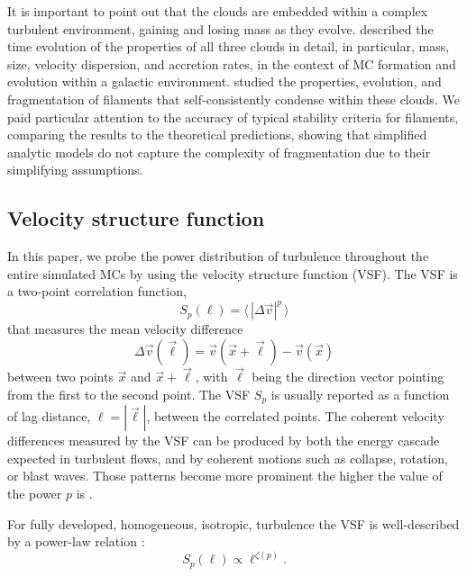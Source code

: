 \documentclass{aa}		%
\begin{document}
It is important to point out that the clouds are embedded within a complex turbulent environment, gaining and losing mass as they evolve.
 described the time evolution of the properties of all three clouds in detail, in particular, mass, size, velocity dispersion, and accretion rates, in the context of MC formation and evolution within a galactic environment.
 studied the properties, evolution, and fragmentation of filaments that self-consistently condense within these clouds. 
We paid particular attention to the accuracy of typical stability criteria for filaments, comparing the results to the theoretical predictions, showing that simplified analytic models do not capture the complexity of fragmentation due to their simplifying assumptions.


\subsection{Velocity structure function}\label{methods:vsf}

In this paper, we probe the power distribution of turbulence throughout the entire simulated MCs by using the velocity structure function (VSF).
The VSF is a two-point correlation function,
\begin{equation}
	{S}_p (\ell) = \langle \, |\Delta \vec{v}|^p  \, \rangle
	\label{equ:method:def_vsf}
\end{equation}
that measures the mean velocity difference 
\begin{equation}
    \Delta \vec{v} (\vec{\ell}) = \vec{v}(\vec{x}+\vec{\ell}) - \vec{v}(\vec{x})
\end{equation} 
between two points $\vec{x}$ and $\vec{x}+\vec{\ell}$, with $\vec{\ell}$ being the direction vector pointing from the first to the second point.
The VSF $S_p$ is usually reported as a function of lag distance, $\ell = |\vec{\ell}|$, between the correlated points.
The coherent velocity differences measured by the VSF can be produced by both the energy cascade expected in turbulent flows, and by coherent motions such as collapse, rotation, or blast waves.
Those patterns become more prominent the higher the value of the power $p$ is \citep{Heyer2004}.

For fully developed, homogeneous, isotropic, turbulence the VSF is well-described by a power-law relation \citep{Kolmogorov1941,She1994,Boldyrev2002}:
\begin{equation}
	\mathit{S}_p (\ell) \propto \ell^{\zeta(p)}.
	\label{equ:method:propto_zeta}
\end{equation}
\end{document}
